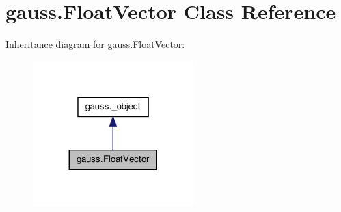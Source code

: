 \hypertarget{classgauss_1_1_float_vector}{\section{gauss.\-Float\-Vector Class Reference}
\label{classgauss_1_1_float_vector}
}


Inheritance diagram for gauss.\-Float\-Vector\-:\nopagebreak
\begin{figure}[H]
\begin{center}
\leavevmode
\includegraphics[width=176pt]{classgauss_1_1_float_vector__inherit__graph}
\end{center}
\end{figure}
